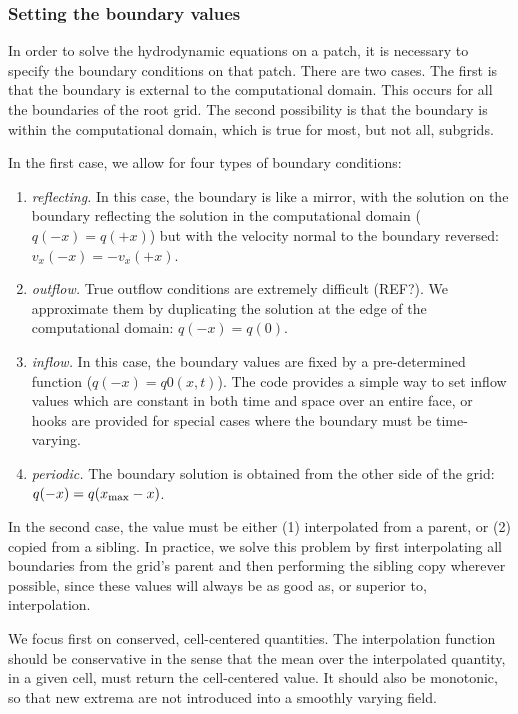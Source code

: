 \subsubsection{Setting the boundary values}
\label{sec:interpolation}

In order to solve the hydrodynamic equations on a patch, it is necessary to specify the boundary conditions on that patch.  There are two cases.  The first is that the boundary is external to the computational domain.  This occurs for all the boundaries of the root grid.  The second possibility is that the boundary is within the computational domain, which is true for most, but not all, subgrids.

In the first case, we allow for four types of boundary conditions:
\begin{enumerate}
  \item{\em reflecting.} In this case, the boundary is like a mirror, with the solution on the boundary reflecting the solution in the computational domain ($q(-x) = q(+x)$) but with the velocity normal to the boundary reversed: $v_x(-x) = -v_x(+x)$.
  \item{\em outflow.} True outflow conditions are extremely difficult (REF?).  We approximate them by duplicating the solution at the edge of the computational domain: $q(-x) = q(0)$.
  \item{\em inflow.} In this case, the boundary values are fixed by a pre-determined function ($q(-x) = q0(x,t)$).  The code provides a simple way to set inflow values which are constant in both time and space over an entire face, or hooks are provided for special cases where the boundary must be time-varying.
  \item{\em periodic.} The boundary solution is obtained from the other side of the grid: $q(-x) = q(x_{\rm{max}}-x)$.
\end{enumerate}

In the second case, the value must be either (1) interpolated from a parent, or (2) copied from a sibling.  In practice, we solve this problem by first interpolating all boundaries from the grid's parent and then performing the sibling copy wherever possible, since these values will always be as good as, or superior to, interpolation.

We focus first on conserved, cell-centered quantities.  The interpolation function should be conservative in the sense that the mean over the interpolated quantity, in a given cell, must return the cell-centered value.  It should also be monotonic, so that new extrema are not introduced into a smoothly varying field.

